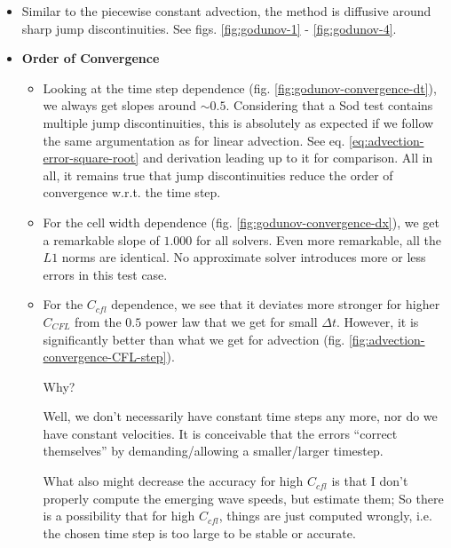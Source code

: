 \begin{itemize}


	\item 	Similar to the piecewise constant advection, the method is diffusive around sharp jump discontinuities.
			See figs. \ref{fig:godunov-1} - \ref{fig:godunov-4}.


	\item \textbf{Order of Convergence}
	
		\begin{itemize}
			
			\item 	Looking at the time step dependence (fig. \ref{fig:godunov-convergence-dt}), we always get slopes around $\sim 0.5$.
					Considering that a Sod test contains multiple jump discontinuities, this is absolutely as expected if we follow the same argumentation as for linear advection.
					See eq. \ref{eq:advection-error-square-root} and derivation leading up to it for comparison.
					All in all, it remains true that jump discontinuities reduce the order of convergence w.r.t. the time step.
					
			\item 	For the cell width dependence (fig. \ref{fig:godunov-convergence-dx}), we get a remarkable slope of $1.000$ for all solvers.
					Even more remarkable, all the $L1$ norms are identical.
					No approximate solver introduces more or less errors in this test case.
			
			\item 	For the $C_{cfl}$ dependence, we see that it deviates more stronger for higher $C_{CFL}$ from the $0.5$ power law that we get for small $\Delta t$.
					However, it is significantly better than what we get for advection (fig. \ref{fig:advection-convergence-CFL-step}).
					
					Why?
					
					Well, we don't necessarily have constant time steps any more, nor do we have constant velocities.
					It is conceivable that the errors ``correct themselves'' by demanding/allowing a smaller/larger timestep.
					
					What also might decrease the accuracy for high $C_{cfl}$ is that I  don't properly compute the emerging wave speeds, but estimate them;
					So there is a possibility that for high $C_{cfl}$, things are just computed wrongly, i.e. the chosen time step is too large to be stable or accurate.
			
		\end{itemize}
\end{itemize}